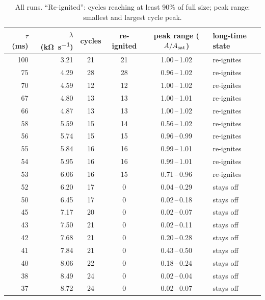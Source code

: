 \begin{table}[!htb]
  \centering
  \small
  \renewcommand{\arraystretch}{1.05}
  \begin{tabular}{@{}rrcccl@{}}
    \toprule
    $\tau$ (ms) & $\lambda$ (\si{\kilo\ohm\per\second}) & cycles & re-ignited & peak range ($A/A_{\mathrm{sat}}$) & long-time state \\
    \midrule
    100 & 3.21 & 21 & 21 & 1.00\,--\,1.02 & \textcolor{upcol}{re-ignites} \\
     75 & 4.29 & 28 & 28 & 0.96\,--\,1.02 & \textcolor{upcol}{re-ignites} \\
     70 & 4.59 & 12 & 12 & 1.00\,--\,1.02 & \textcolor{upcol}{re-ignites} \\
     67 & 4.80 & 13 & 13 & 1.00\,--\,1.01 & \textcolor{upcol}{re-ignites} \\
     66 & 4.87 & 13 & 13 & 1.00\,--\,1.02 & \textcolor{upcol}{re-ignites} \\
     58 & 5.59 & 15 & 14 & 0.56\,--\,1.02 & \textcolor{upcol}{re-ignites} \\
     56 & 5.74 & 15 & 15 & 0.96\,--\,0.99 & \textcolor{upcol}{re-ignites} \\
     55 & 5.84 & 16 & 16 & 0.99\,--\,1.01 & \textcolor{upcol}{re-ignites} \\
     54 & 5.95 & 16 & 16 & 0.99\,--\,1.01 & \textcolor{upcol}{re-ignites} \\
     53 & 6.06 & 16 & 15 & 0.71\,--\,0.96 & \textcolor{upcol}{re-ignites} \\
    \midrule
     52 & 6.20 & 17 & 0 & 0.04\,--\,0.29 & \textcolor{dncol}{stays off} \\
     50 & 6.45 & 17 & 0 & 0.02\,--\,0.18 & \textcolor{dncol}{stays off} \\
     45 & 7.17 & 20 & 0 & 0.02\,--\,0.07 & \textcolor{dncol}{stays off} \\
     43 & 7.50 & 21 & 0 & 0.02\,--\,0.11 & \textcolor{dncol}{stays off} \\
     42 & 7.68 & 21 & 0 & 0.20\,--\,0.28 & \textcolor{dncol}{stays off} \\
     41 & 7.84 & 21 & 0 & 0.43\,--\,0.50 & \textcolor{dncol}{stays off} \\
     40 & 8.06 & 22 & 0 & 0.18\,--\,0.24 & \textcolor{dncol}{stays off} \\
     38 & 8.49 & 24 & 0 & 0.02\,--\,0.04 & \textcolor{dncol}{stays off} \\
     37 & 8.72 & 24 & 0 & 0.02\,--\,0.07 & \textcolor{dncol}{stays off} \\
    \bottomrule
  \end{tabular}
  \caption[Stage 4: summary of all runs]{All runs. ``Re-ignited'': cycles reaching at least 90\% of full
  size; peak range: smallest and largest cycle peak.}
  \label{tab:s4-runs}
\end{table}

